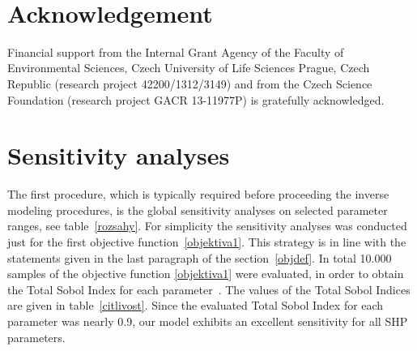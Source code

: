 \documentclass[review,times,3p,10pt]{elsarticle}
\begin{document}


\bigskip
~
\bigskip

\section{Acknowledgement}

Financial support from the Internal Grant Agency of the Faculty of Environmental Sciences, Czech University of Life Sciences Prague, Czech Republic (research project 42200/1312/3149) and from the Czech Science Foundation (research project GACR 13-11977P) is gratefully acknowledged.




 


\appendix
 \section{Sensitivity analyses} 

The first procedure, which is typically required before proceeding the inverse modeling procedures, is the global sensitivity analyses on  selected parameter ranges, see table~\ref{rozsahy}. For simplicity the sensitivity analyses was conducted just for the first objective function~\eqref{objektiva1}. This strategy is in line with the statements given in the last paragraph of the section~\ref{objdef}. In total 10.000 samples of the objective function \eqref{objektiva1}  were evaluated, in order to obtain the  Total Sobol Index for each parameter~\citep{kniha-citlivost}. The values of the Total Sobol Indices are given in table~\ref{citlivost}. Since the evaluated Total Sobol Index for each parameter was nearly 0.9, our model exhibits an excellent sensitivity for all SHP parameters. 
\end{document}
